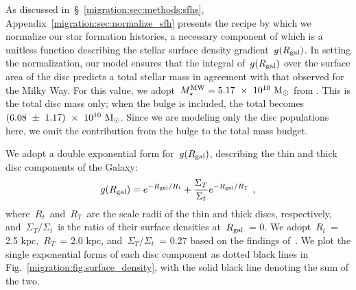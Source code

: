 As discussed in~\S~\ref{migration:sec:methods:sfhs}, Appendix~\ref{migration:sec:normalize_sfh} 
presents the recipe by which we normalize our star formation histories, a 
necessary component of which is a unitless function describing the stellar 
surface density gradient~$g(R_\text{gal})$. 
In setting the normalization, our model ensures that the integral of~$g(R_\text{gal})$ 
over the surface area of the disc predicts a total stellar mass in agreement 
with that observed for the Milky Way. 
For this value, we adopt~$M_\star^\text{MW} = 5.17~\times~10^{10}~\text{M}_\odot$ from 
\citet[][$\pm 1.11\times10^{10}~\msun$]{Licquia2015}. 
This is the total disc mass only; when the bulge is included, the total 
becomes~$(6.08~\pm~1.17)~\times~10^{10}~\text{M}_\odot$. 
Since we are modeling only the disc populations here, we omit the contribution 
from the bulge to the total mass budget. 
\par 
We adopt a double exponential form for~$g(R_\text{gal})$, describing the thin and 
thick disc components of the Galaxy: 
\begin{equation} 
g(R_\text{gal}) = e^{-R_\text{gal}/R_t} + \frac{\Sigma_T}{\Sigma_t} 
e^{-R_\text{gal}/R_T}~, 
\label{migration:eq:gradient} 
\end{equation} 
where~$R_t$~and~$R_T$~are the scale radii of the thin and thick discs, 
respectively, and~$\Sigma_T/\Sigma_t$~is the ratio of their surface densities 
at~$R_\text{gal}$~= 0. 
We adopt~$R_t$~= 2.5 kpc,~$R_T$~= 2.0 kpc, and~$\Sigma_T/\Sigma_t$~= 0.27 based 
on the findings of~\citet{Bland-Hawthorn2016}. 
We plot the single exponential forms of each disc component as dotted black 
lines in Fig.~\ref{migration:fig:surface_density}, with the solid black line denoting the 
sum of the two. 

